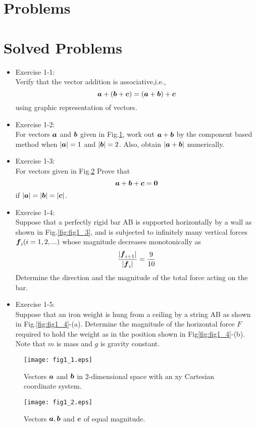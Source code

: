 \documentclass[10pt,a4j]{article}
\begin{document}
\section{Problems}
\section*{Solved Problems}
\begin{itemize}
\item
Exercise 1-1:\\
Verify that the vector addition is associative,i.e., 
\[
	\mbox{\boldmath $a$}+(\mbox{\boldmath $b$}+\mbox{\boldmath $c$})=
		(\mbox{\boldmath $a$}+\mbox{\boldmath $b$})+\mbox{\boldmath $c$}
\]
using graphic representation of vectors. 
\item
Exercise 1-2:\\
For vectors $\mbox{\boldmath $a$}$ and $\mbox{\boldmath $b$}$ given in Fig.\ref{fig:fig1_1}, 
work out $\mbox{\boldmath $a$}+\mbox{\boldmath $b$}$ by the component based 
		method when  $|\mbox{\boldmath $a$}|=1$ and $|\mbox{\boldmath $b$}|=2$.
		Also, obtain $|\mbox{\boldmath $a$}+\mbox{\boldmath $b$}|$ numerically.
\item
Exercise 1-3:\\
		For vectors given in Fig.\ref{fig:fig1_2} Prove that 
	\[
		\mbox{\boldmath $a$}+\mbox{\boldmath $b$}+\mbox{\boldmath $c$}=\mbox{\boldmath $0$}
	\]
		if $|\mbox{\boldmath $a$}|=|\mbox{\boldmath $b$}|=|\mbox{\boldmath $c$}|$.
\item
Exercise 1-4:\\
Suppose that a perfectly rigid bar AB is supported horizontally by a wall
 as shown in Fig.\ref{fig:fig1_3}, and is subjected to infinitely many 
vertical forces $\mbox{\boldmath $f$}_i (i=1,2,...)$ whose magnitude decreases monotonically as 
\[
 \frac{
	|\mbox{\boldmath $f$}_{i+1}|
	}{
	|\mbox{\boldmath $f$}_i|
}
	=\frac{9}{10} 
\]
Determine the direction and the magnitude of the total force acting on the bar. 
\item
Exercise 1-5:\\
	Suppose that an iron weight is hung from a ceiling by a string AB as shown in Fig.\ref{fig:fig1_4}-(a). 
	Determine the magnitude of the horizontal force $F$ required to hold the weight as 
	in the position shown in Fig\ref{fig:fig1_4}-(b).
	Note that $m$ is mass and $g$ is gravity constant.  
\end{itemize}
\begin{figure}[h]
	\begin{center}
	\texttt{[image: fig1\_1.eps]} 
	\end{center}
	\caption{Vectors $\mbox{\boldmath $a$}$ and $\mbox{\boldmath $b$}$ in 2-dimensional space with an
	xy Cartesian coordinate system.}
	\label{fig:fig1_1}
\end{figure}
\begin{figure}[h]
	\begin{center}
	\texttt{[image: fig1\_2.eps]} 
	\end{center}
	\caption{Vectors $\mbox{\boldmath $a$}, \mbox{\boldmath $b$}$ and $\mbox{\boldmath $c$}$ of equal magnitude.} 
	\label{fig:fig1_2}
\end{figure}
\end{document}
